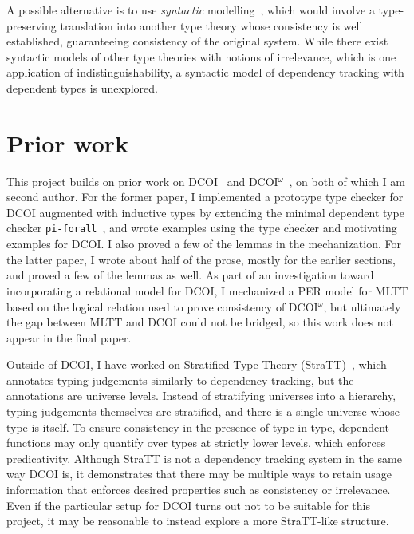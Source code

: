 \documentclass{article}
\begin{document}
A possible alternative is to use \emph{syntactic} modelling~\citep{syntactic},
which would involve a type-preserving translation into another type theory
whose consistency is well established,
guaranteeing consistency of the original system.
While there exist syntactic models of other type theories \citep{sprop,ghosts}
with notions of irrelevance, which is one application of indistinguishability,
a syntactic model of dependency tracking with dependent types is unexplored.


\section{Prior work} \label{sec:prior}

This project builds on prior work on DCOI~\citep{dcoi} and DCOI$^\omega$~\citep{dcoi-omega},
on both of which I am second author.
For the former paper,
I implemented a prototype type checker for DCOI augmented with inductive types
by extending the minimal dependent type checker \texttt{pi-forall}~\citep{pi-forall},
and wrote examples using the type checker and motivating examples for DCOI.
I also proved a few of the lemmas in the mechanization.
For the latter paper,
I wrote about half of the prose, mostly for the earlier sections,
and proved a few of the lemmas as well.
As part of an investigation toward incorporating a relational model for DCOI,
I mechanized a PER model for MLTT based on the logical relation
used to prove consistency of DCOI$^\omega$,
but ultimately the gap between MLTT and DCOI could not be bridged,
so this work does not appear in the final paper.

Outside of DCOI, I have worked on Stratified Type Theory (StraTT)~\citep{stratt},
which annotates typing judgements similarly to dependency tracking,
but the annotations are universe levels.
Instead of stratifying universes into a hierarchy,
typing judgements themselves are stratified,
and there is a single universe whose type is itself.
To ensure consistency in the presence of type-in-type,
dependent functions may only quantify over types at strictly lower levels,
which enforces predicativity.
Although StraTT is not a dependency tracking system in the same way DCOI is,
it demonstrates that there may be multiple ways to retain usage information
that enforces desired properties such as consistency or irrelevance.
Even if the particular setup for DCOI turns out not to be suitable for this project,
it may be reasonable to instead explore a more StraTT-like structure.
\end{document}
